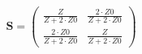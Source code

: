 \documentclass[10pt]{article} \usepackage{amsmath} \usepackage{bbold}
\begin{document}
\[ \mathbf{S}=\left(\begin{array}{cc} \frac{Z}{Z+2\cdot Z0} &
\frac{2\cdot Z0}{Z+2\cdot Z0} \\ \frac{2\cdot Z0}{Z+2\cdot Z0} &
\frac{Z}{Z+2\cdot Z0} \end{array}\right) \]
\end{document}
